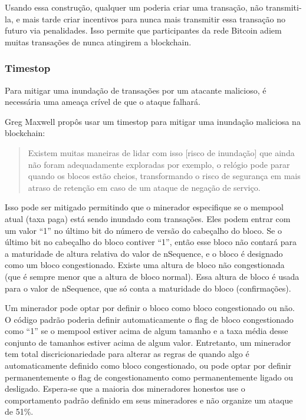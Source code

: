 \documentclass[letterpaper,11pt]{article}
\begin{document}
Usando essa construção, qualquer um poderia criar uma transação, não
transmiti-la, e mais tarde criar incentivos para nunca mais transmitir essa
transação no futuro via penalidades. Isso permite que participantes da rede
Bitcoin adiem muitas transações de nunca atingirem a blockchain.

\subsubsection{Timestop}

Para mitigar uma inundação de transações por um atacante malicioso, é
necessária uma ameaça crível de que o ataque falhará.

Greg Maxwell propôs usar um timestop para mitigar uma inundação maliciosa na
blockchain:

\begin{quote}
	Existem muitas maneiras de lidar com isso [risco de inundação] que
	ainda não foram adequadamente exploradas \textemdash por exemplo, o
	relógio pode parar quando os blocos estão cheios, transformando o
	risco de segurança em mais atraso de retenção em caso de um ataque de
	negação de serviço.\cite{gregtimestop}
\end{quote}

Isso pode ser mitigado permitindo que o minerador especifique se o mempool
atual (taxa paga) está sendo inundado com transações. Eles podem entrar com
um valor ``1'' no último bit do número de versão do cabeçalho do bloco. Se o
último bit no cabeçalho do bloco contiver ``1'', então esse bloco não contará
para a maturidade de altura relativa do valor de nSequence, e o bloco é
designado como um bloco congestionado. Existe uma altura de bloco não
congestionada (que é sempre menor que a altura de bloco normal). Essa altura
de bloco é usada para o valor de nSequence, que só conta a maturidade do
bloco (confirmações).

Um minerador pode optar por definir o bloco como bloco congestionado ou não.
O código padrão poderia definir automaticamente o flag de bloco congestionado
como ``1'' se o mempool estiver acima de algum tamanho e a taxa média desse
conjunto de tamanhos estiver acima de algum valor. Entretanto, um minerador
tem total discricionariedade para alterar as regras de quando algo é
automaticamente definido como bloco congestionado, ou pode optar por definir
permanentemente o flag de congestionamento como permanentemente ligado ou
desligado. Espera-se que a maioria dos mineradores honestos use o
comportamento padrão definido em seus mineradores e não organize um ataque
de 51\%.
\end{document}
